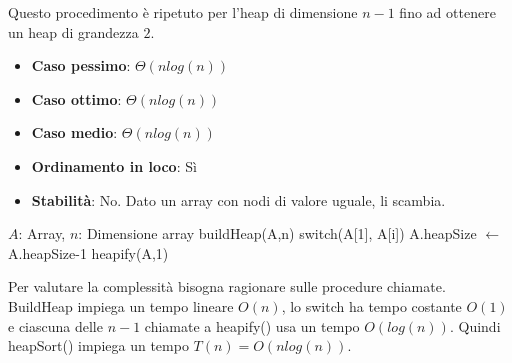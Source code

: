 Questo procedimento è ripetuto per l'heap di dimensione $n-1$ fino ad ottenere un heap di grandezza $2$. \begin{itemize}
	\item \textbf{Caso pessimo}: $\Theta(nlog(n))$
	\item \textbf{Caso ottimo}: $\Theta(nlog(n))$
	\item \textbf{Caso medio}: $\Theta(nlog(n))$
	\item \textbf{Ordinamento in loco}: Sì
	\item \textbf{Stabilità}: No. Dato un array con nodi di valore uguale, li scambia.
\end{itemize}
\begin{algorithm}[H]
	\caption{heapSort(A,n)}
	\begin{algorithmic}[i]
		\Require $A$: Array, $n$: Dimensione array
		\State buildHeap(A,n)
		\State
		 
		\State switch(A[1], A[i]) 
		\State A.heapSize $\gets$ A.heapSize-1 
		\State heapify(A,1) 
		\EndFor
	\end{algorithmic}
\end{algorithm}
\noindent Per valutare la complessità bisogna ragionare sulle procedure chiamate. BuildHeap impiega un tempo lineare $O(n)$, lo switch ha tempo costante $O(1)$ e ciascuna delle $n-1$ chiamate a heapify() usa un tempo $O(log(n))$. Quindi heapSort() impiega un tempo $T(n) = O(nlog(n))$.

%

